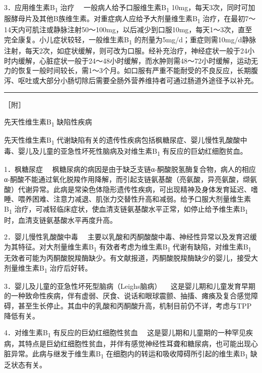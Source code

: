 {3．应用维生素B\textsubscript{1} 治疗}
　一般病人给予口服维生素B\textsubscript{1}
10mg，每天3次，同时可加服酵母片及其他B族维生素。对重症病人应给予大剂量维生素B\textsubscript{1}
治疗，在最初7～14天内可肌注或静脉注射50～100mg，以后减少到口服10mg，每天1～3次，直至完全康复。小儿症状较轻，一般维生素B\textsubscript{1}
的剂量为5mg/d；重症则需10mg/d静脉注射，每天2次，如症状缓解，则可改为口服。经补充治疗，神经症状一般于24小时内缓解，心脏症状一般于24～48小时缓解，而水肿则需48～72小时缓解，运动无力的恢复一般时间较长，需1～3个月。如口服有严重不能耐受的不良反应，长期腹泻、呕吐或大部分小肠切除后需要全肠外营养维持者可通过肠道外途径予以补充。

\begin{center}\rule{0.5\linewidth}{\linethickness}\end{center}

［附］

先天性维生素B\textsubscript{1} 缺陷性疾病

先天性维生素B\textsubscript{1}
代谢缺陷有关的遗传性疾病包括枫糖尿症、婴儿慢性乳酸酸中毒、婴儿及儿童的亚急性坏死性脑病及对维生素B\textsubscript{1}
有反应的巨幼红细胞贫血。

{1．枫糖尿症}
　枫糖尿病的病因是由于缺乏支链α-酮酸脱氢酶复合物，病人的相应α-酮酸不能通过氧化脱羧作用降解，而引起支链氨基酸（亮氨酸，异亮氨酸，缬氨酸）代谢异常。此病是常染色体隐形遗传性疾病，可出现精神及身体发育延迟、嗜睡、喂养困难、注意力减退、肌张力交替性升高和减弱。给予口服大剂量维生素B\textsubscript{1}
治疗，可减轻临床症状，使血清支链氨基酸水平正常，如停止给予维生素B\textsubscript{1}
时，血清支链氨基酸水平再度升高。

{2．婴儿慢性乳酸酸中毒}
　主要以乳酸和丙酮酸酸中毒、神经性异常以及发育迟缓为其特征。对大剂量维生素B\textsubscript{1}
有效者考虑为维生素B\textsubscript{1}
代谢有缺陷，对维生素B\textsubscript{1}
无效者可能为丙酮酸脱羧酶缺少。有文献报道，丙酮酸脱羧酶缺少的婴儿，接受大剂量维生素B\textsubscript{1}
治疗后好转。

{3．婴儿及儿童的亚急性坏死型脑病（Leighs脑病）}
　这是婴儿期和儿童发育早期的一种致命性疾病，伴有虚弱、厌食、说话和眼球震颤、抽搐、瘫痪及复合感觉障碍，甚至生长停止。其血中的乳酸和丙酮酸升高，机制目前仍不详，考虑与TPP降低有关。

{4．对维生素B\textsubscript{1} 有反应的巨幼红细胞性贫血}
　这是婴儿期和儿童期的一种罕见疾病，其特点是巨幼红细胞性贫血，并伴有感觉神经性耳聋和糖尿病，也可能出现心脏异常。此病与继发于维生素B\textsubscript{1}
在细胞内的转运和吸收障碍所引起的维生素B\textsubscript{1} 缺乏状态有关。

